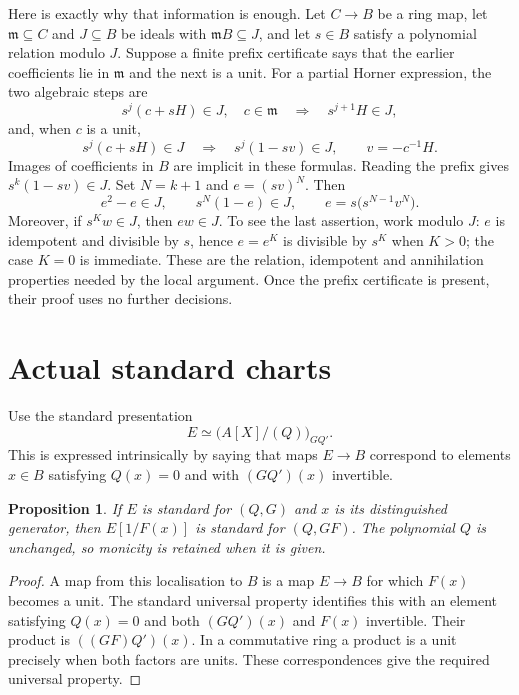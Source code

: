 \documentclass[11pt]{article}
\newtheorem{proposition}[theorem]{Proposition}
\begin{document}
Here is exactly why that information is enough. Let $C\to B$ be a
ring map, let $\mathfrak m\subseteq C$ and $J\subseteq B$ be ideals with
$\mathfrak m B\subseteq J$, and let $s\in B$ satisfy a polynomial
relation modulo $J$. Suppose a finite prefix certificate says that
the earlier coefficients lie in $\mathfrak m$ and the next is a unit.
For a partial Horner expression, the two algebraic steps are
\[
 s^j(c+sH)\in J,\quad c\in\mathfrak m
       \quad\Longrightarrow\quad s^{j+1}H\in J,
\]
and, when $c$ is a unit,
\[
 s^j(c+sH)\in J
       \quad\Longrightarrow\quad s^j(1-sv)\in J,
       \qquad v=-c^{-1}H.
\]
Images of coefficients in $B$ are implicit in these formulas. Reading
the prefix gives $s^k(1-sv)\in J$. Set $N=k+1$ and $e=(sv)^N$.
Then
\[
 e^2-e\in J,\qquad s^N(1-e)\in J,\qquad
 e=s\bigl(s^{N-1}v^N\bigr).
\]
Moreover, if $s^K w\in J$, then $ew\in J$. To see the last assertion,
work modulo $J$: $e$ is idempotent and divisible by $s$, hence
$e=e^K$ is divisible by $s^K$ when $K>0$; the case $K=0$ is immediate.
These are the relation, idempotent and annihilation properties needed
by the local argument. Once the prefix certificate is present, their
proof uses no further decisions.

\section{Actual standard charts}

Use the standard presentation
\[
        E\simeq \bigl(A[X]/(Q)\bigr)_{GQ'}.
\]
This is expressed intrinsically by saying that maps $E\to B$ correspond
to elements $x\in B$ satisfying $Q(x)=0$ and with $(GQ')(x)$ invertible.

\begin{proposition}\label{prop:standard}
If $E$ is standard for $(Q,G)$ and $x$ is its distinguished generator,
then $E[1/F(x)]$ is standard for $(Q,GF)$. The polynomial $Q$ is
unchanged, so monicity is retained when it is given.
\end{proposition}
\begin{proof}
A map from this localisation to $B$ is a map $E\to B$ for which $F(x)$
becomes a unit. The standard universal property identifies this with
an element satisfying $Q(x)=0$ and both $(GQ')(x)$ and $F(x)$ invertible.
Their product is $((GF)Q')(x)$. In a commutative ring a product is a
unit precisely when both factors are units. These correspondences give
the required universal property.
\end{proof}
\end{document}
